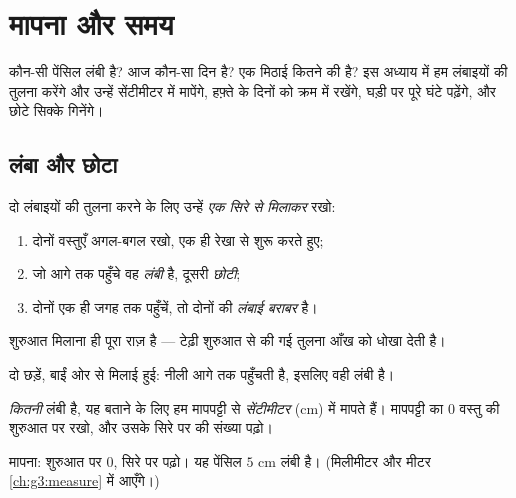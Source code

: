 \chapter{मापना और समय}\label{ch:g1:measure}

कौन-सी पेंसिल लंबी है? आज कौन-सा दिन है? एक मिठाई कितने की है?
इस अध्याय में हम लंबाइयों की तुलना करेंगे और उन्हें सेंटीमीटर
में मापेंगे, हफ़्ते के दिनों को क्रम में रखेंगे, घड़ी पर पूरे
घंटे पढ़ेंगे, और छोटे सिक्के गिनेंगे।

\section{लंबा और छोटा}

\begin{method}[लंबाइयों की तुलना]\label{met:g1:measure:compare}
दो लंबाइयों की तुलना करने के लिए उन्हें \emph{एक सिरे से मिलाकर} रखो:
\begin{enumerate}
  \item दोनों वस्तुएँ अगल-बगल रखो, एक ही रेखा से शुरू करते हुए;
  \item जो आगे तक पहुँचे वह \emph{लंबी} है, दूसरी
        \emph{छोटी};
  \item दोनों एक ही जगह तक पहुँचें, तो दोनों की \emph{लंबाई
        बराबर} है।
\end{enumerate}
शुरुआत मिलाना ही पूरा राज़ है --- टेढ़ी शुरुआत से की गई तुलना
आँख को धोखा देती है।
\end{method}

\begin{omfigure}

{\small दो छड़ें, बाईं ओर से मिलाई हुई: नीली आगे तक पहुँचती
है, इसलिए वही लंबी है।}
\end{omfigure}

\begin{definition}[सेंटीमीटर]\label{def:g1:measure:cm}
\emph{कितनी} लंबी है, यह बताने के लिए हम मापपट्टी से
\emph{सेंटीमीटर} (cm) में मापते हैं। मापपट्टी का $0$ वस्तु की
शुरुआत पर रखो, और उसके सिरे पर की संख्या पढ़ो।
\end{definition}

\begin{omfigure}

{\small मापना: शुरुआत पर $0$, सिरे पर पढ़ो। यह पेंसिल
$5$ cm लंबी है। (मिलीमीटर और मीटर
\cref{ch:g3:measure} में आएँगे।)}
\end{omfigure}

